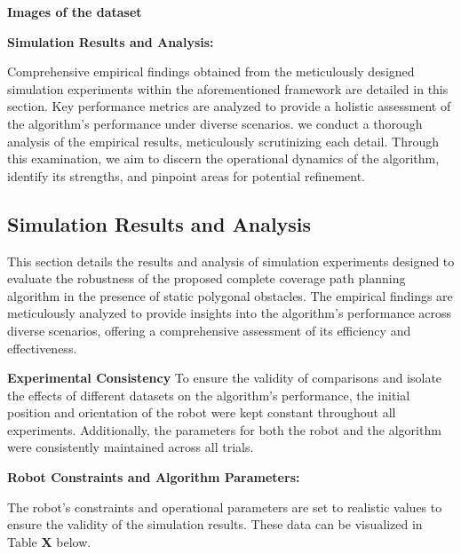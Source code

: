 \textbf{Images of the dataset}


\textbf{Simulation Results and Analysis:} 

Comprehensive empirical findings obtained from the meticulously designed simulation experiments within the aforementioned framework are detailed in this section. Key performance metrics are analyzed to provide a holistic assessment of the algorithm's performance under diverse scenarios. we conduct a thorough analysis of the empirical results, meticulously scrutinizing each detail. Through this examination, we aim to discern the operational dynamics of the algorithm, identify its strengths, and pinpoint areas for potential refinement.
\vspace*{6mm}  


\subsection{Simulation Results and Analysis}

This section details the results and analysis of simulation experiments designed to evaluate the robustness of the proposed complete coverage path planning algorithm in the presence of static polygonal obstacles. The empirical findings are meticulously analyzed to provide insights into the algorithm's performance across diverse scenarios, offering a comprehensive assessment of its efficiency and effectiveness.

\vspace*{6mm}  

\textbf{Experimental Consistency}
To ensure the validity of comparisons and isolate the effects of different datasets on the algorithm's performance, the initial position and orientation of the robot were kept constant throughout all experiments. Additionally, the parameters for both the robot and the algorithm were consistently maintained across all trials.

\vspace*{6mm}  

\textbf{Robot Constraints and Algorithm Parameters: } 


The robot's constraints and operational parameters are set to realistic values to ensure the validity of the simulation results. These data can be visualized in Table \textbf{X} below.

